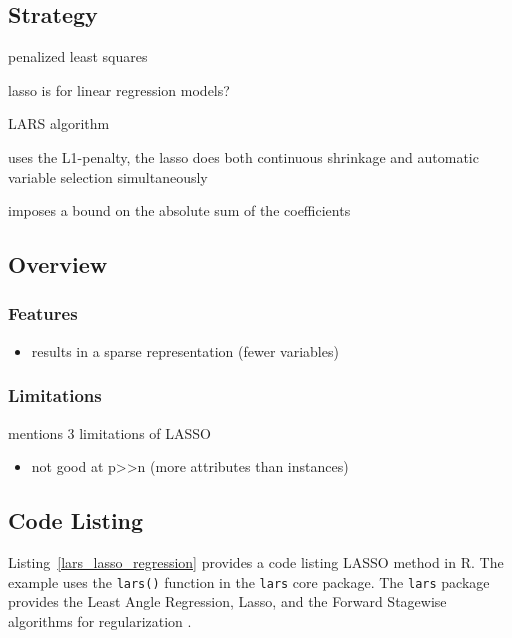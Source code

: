 \subsection{Strategy}

penalized least squares

lasso is for linear regression models?

LARS algorithm

uses the L1-penalty, the lasso does both continuous shrinkage and automatic variable selection simultaneously

imposes a bound on the absolute sum of the coefficients

\subsection{Overview}

\subsubsection{Features}

\begin{itemize}
	\item results in a sparse representation (fewer variables)
\end{itemize}

\subsubsection{Limitations}

\cite{Zou2005} mentions 3 limitations of LASSO

\begin{itemize}
	\item not good at p>>n (more attributes than instances)
\end{itemize}


\subsection{Code Listing}
Listing~\ref{lars_lasso_regression} provides a code listing LASSO method in R.
The example uses the \texttt{lars()} function in the \texttt{lars} core package. The \texttt{lars} package provides the Least Angle Regression, Lasso, and the Forward Stagewise algorithms for regularization \cite{Hastie2011}.


